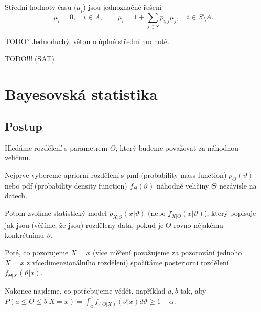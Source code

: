 \documentclass[12pt]{article}					%
\begin{document}
\begin{veta}
	Střední hodnoty času ($\mu_i$) jsou jednoznačné řešení
	$$ \mu_i = 0, \quad i \in A, \qquad \mu_i = 1 + \sum_{j \in S} p_{i, j} \mu_j, \quad i \in S \setminus A. $$

	\begin{dukazin}
		TODO? Jednoduchý, větou o úplné střední hodnotě. %
	\end{dukazin}
\end{veta}

TODO!!! (SAT) %

\section{Bayesovská statistika}

\subsection{Postup}

\begin{definice}
	Hledáme rozdělení s parametrem $\Theta$, který budeme považovat za náhodnou veličinu.
\end{definice}

\begin{definice}
	Nejprve vybereme apriorní rozdělení s pmf (probability mass function) $p_\Theta(\vartheta)$ nebo pdf (probability density function) $f_\Theta(\vartheta)$ náhodné veličiny $\Theta$ nezávisle na datech.
\end{definice}

\begin{definice}
	Potom zvolíme statistický model $p_{X|\Theta}(x|\vartheta)$ (nebo $f_{X|\Theta}(x|\vartheta)$), který popisuje jak jsou (věříme, že jsou) rozděleny data, pokud je $\Theta$ rovno nějakému konkrétnímu $\vartheta$.
\end{definice}

\begin{definice}
	Poté, co pozorujeme $X = x$ (více měření považujeme za pozorování jednoho $X = x$ z vícedimenzionálního rozdělení) spočítáme posteriorní rozdělení $f_{\Theta | X}(\vartheta | x)$.
\end{definice}

\begin{poznamka}
	Nakonec najdeme, co potřebujeme vědět, například $a, b$ tak, aby $P(a ≤ \Theta ≤ b | X = x) = \int_a^b f_{(\Theta | X)}(\vartheta | x) d\vartheta ≥ 1 - \alpha$.
\end{poznamka}
\end{document}
